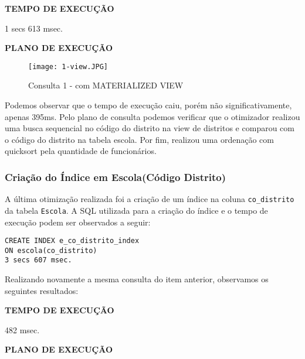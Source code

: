 \documentclass[12pt,a4paper]{article}
\begin{document}
\vspace{0.01cm}
\begin{flushleft}
\textbf{TEMPO DE EXECUÇÃO}\\
\end{flushleft}
1 secs 613 msec.\\

\begin{flushleft}
\textbf{PLANO DE EXECUÇÃO}\\
\end{flushleft}

\begin{figure}[H]
    \centering
    \texttt{[image: 1-view.JPG]}
    \caption{Consulta 1 - com MATERIALIZED VIEW}
    \label{fig:diagrama}
\end{figure}

Podemos observar que o tempo de execução caiu, porém não significativamente, apenas 395ms. Pelo plano de consulta podemos verificar que o otimizador realizou uma busca sequencial no código do distrito na view de distritos e comparou com o código do distrito na tabela escola. Por fim, realizou uma ordenação com quicksort pela quantidade de funcionários.


\subsubsection{Criação do Índice em Escola(Código Distrito)}

A última otimização realizada foi a criação de um índice na coluna \texttt{co\_distrito} da tabela \texttt{Escola}. A SQL utilizada para a criação do índice e o tempo de execução podem ser observados a seguir:

\begin{verbatim}
CREATE INDEX e_co_distrito_index 
ON escola(co_distrito)
3 secs 607 msec.
\end{verbatim}

Realizando novamente a mesma consulta do item anterior, observamos os seguintes resultados:

\vspace{0.01cm}
\begin{flushleft}
\textbf{TEMPO DE EXECUÇÃO}\\
\end{flushleft}
482 msec.\\

\begin{flushleft}
\textbf{PLANO DE EXECUÇÃO}\\
\end{flushleft}
\end{document}
